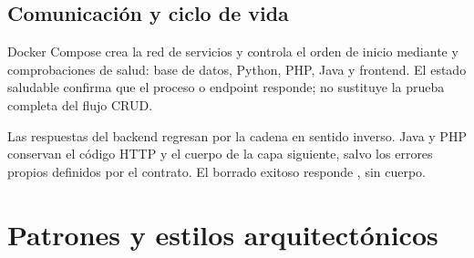 \subsection{Comunicación y ciclo de vida}

Docker Compose crea la red de servicios y controla el orden de inicio mediante  y comprobaciones de salud: base de datos, Python, PHP, Java y frontend. El estado saludable confirma que el proceso o endpoint responde; no sustituye la prueba completa del flujo CRUD.

Las respuestas del backend regresan por la cadena en sentido inverso. Java y PHP conservan el código HTTP y el cuerpo de la capa siguiente, salvo los errores propios definidos por el contrato. El borrado exitoso responde , sin cuerpo.

\section{Patrones y estilos arquitectónicos}

